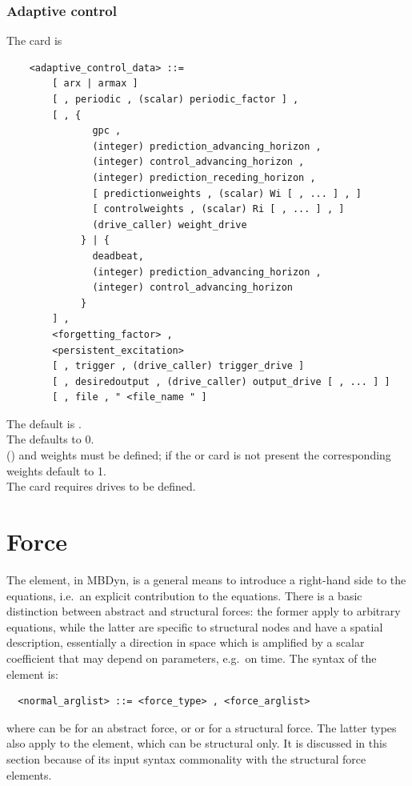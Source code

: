 \subsubsection{Adaptive control}
The  card is
\begin{verbatim}
    <adaptive_control_data> ::=
        [ arx | armax ]
        [ , periodic , (scalar) periodic_factor ] ,
        [ , { 
               gpc ,
               (integer) prediction_advancing_horizon ,
               (integer) control_advancing_horizon ,
               (integer) prediction_receding_horizon ,
               [ predictionweights , (scalar) Wi [ , ... ] , ]
               [ controlweights , (scalar) Ri [ , ... ] , ]
               (drive_caller) weight_drive
             } | { 
               deadbeat,
               (integer) prediction_advancing_horizon ,
               (integer) control_advancing_horizon
             }
        ] ,
        <forgetting_factor> ,
        <persistent_excitation>
        [ , trigger , (drive_caller) trigger_drive ]
        [ , desiredoutput , (drive_caller) output_drive [ , ... ] ]
        [ , file , " <file_name " ]            
\end{verbatim}
The default is .\\
The  defaults to 0.\\
() 
 and 
  weights must be defined; if the 
or  card is not present the corresponding weights default
to 1.\\ 
The 
card requires  drives to be defined.


\section{Force}\label{sec:EL:FORCE}
The  element, in MBDyn, is a general means to introduce 
a right-hand side to the equations, i.e.\ an explicit contribution
to the equations.
There is a basic distinction between abstract and structural forces:
the former apply to arbitrary equations, while the latter are specific
to structural nodes and have a spatial description, essentially
a direction in space which is amplified by a scalar coefficient
that may depend on parameters, e.g.\ on time.
The syntax of the  element is:
\begin{verbatim}
  <normal_arglist> ::= <force_type> , <force_arglist>
\end{verbatim}
where  can be  for an abstract force, or 
 or  for a structural force.
The latter types also apply to the  element,
which can be structural only.
It is discussed in this section because of its input syntax commonality 
with the structural force elements.

